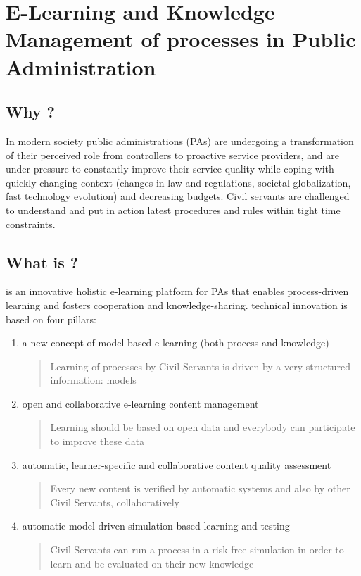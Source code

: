 \documentclass{learnpad}
\begin{document}


\mainmatter


\chapter{E-Learning and Knowledge Management of processes in Public Administration}
\label{ch:intro}

\section{Why \learnpad?}
In modern society public administrations (PAs) are undergoing a transformation
of their perceived role from controllers to proactive service providers, and are
under pressure to constantly improve their service quality while coping with
quickly changing context (changes in law and regulations, societal
globalization, fast technology evolution) and decreasing budgets.  Civil
servants are challenged to understand and put in action latest procedures and
rules within tight time constraints.

\section{What is \learnpad?}
\learnpad is an innovative holistic e-learning platform for PAs that enables
process-driven learning and fosters cooperation and knowledge-sharing.
\learnpad technical innovation is based on four pillars:
\begin{enumerate}
	\item a new concept of model-based e-learning (both process and knowledge)
		\begin{quote}
			Learning of processes by Civil Servants is driven by a very
			structured information: models
		\end{quote}
	\item open and collaborative e-learning content management
		\begin{quote}
			Learning should be based on open data and everybody can participate
			to improve these data
		\end{quote}
	\item automatic, learner-specific and collaborative content quality assessment
		\begin{quote}
			Every new content is verified by automatic systems and also by other
			Civil Servants, collaboratively
		\end{quote}
	\item automatic model-driven simulation-based learning and testing
		\begin{quote}
			Civil Servants can run a process in a risk-free simulation in order
			to learn and be evaluated on their new knowledge
		\end{quote}
\end{enumerate}
\end{document}
